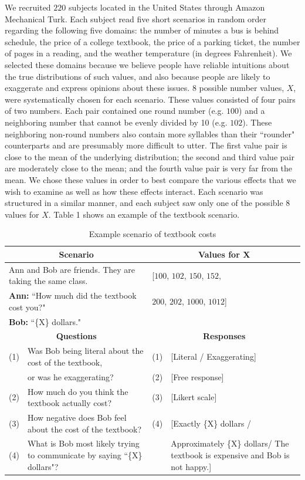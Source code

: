 \documentclass{article} %
\begin{document}
We recruited $220$ subjects located in the United States through Amazon Mechanical Turk. Each subject read five short scenarios in random order regarding the following five domains: the number of minutes a bus is behind schedule, the price of a college textbook, the price of a parking ticket, the number of pages in a reading, and the weather temperature (in degrees Fahrenheit). We selected these domains because we believe people have reliable intuitions about the true distributions of such values, and also because people are likely to exaggerate and express opinions about these issues. $8$ possible number values, $X$, were systematically chosen for each scenario. These values consisted of four pairs of two numbers. Each pair contained one round number (e.g. $100$) and a neighboring number that cannot be evenly divided by 10 (e.g. $102$). These neighboring non-round numbers also contain more syllables than their ``rounder" counterparts and are presumably more difficult to utter. The first value pair is close to the mean of the underlying distribution; the second and third value pair are moderately close to the mean; and the fourth value pair is very far from the mean. We chose these values in order to best compare the various effects that we wish to examine as well as how these effects interact. Each scenario was structured in a similar manner, and each subject saw only one of the possible $8$ values for $X$. Table 1 shows an example of the textbook scenario.
\begin{table}[h]
\begin{tabular}{| p{0.15cm}  p{8.15cm}| p{0.15cm}p{4cm} |}\hline
\multicolumn{2}{|c|}{\textbf{Scenario}} & \multicolumn{2}{|c|}{\textbf{Values for X}} \\\hline
\multicolumn{2}{|l|}{Ann and Bob are friends. They are taking the same class.} & \multicolumn{2}{|l|}{[$100$, $102$, $150$, $152$,}\\
\multicolumn{2}{|l|}{\textbf{Ann:} ``How much did the textbook cost you?"} & \multicolumn{2}{|l|}{$200$, $202$, $1000$, $1012$]}\\
\multicolumn{2}{|l|}{\textbf{Bob:} ``\{X\} dollars."} & \multicolumn{2}{|l|}{}\\\hline
\multicolumn{2}{|c|}{\textbf{Questions}} & \multicolumn{2}{|c|}{\textbf{Responses}} \\\hline
(1) & Was Bob being literal about the cost of the textbook, & (1) &[Literal / Exaggerating] \\
 & or was he exaggerating? & (2) & [Free response] \\
(2) & How much do you think the textbook actually cost? & (3) & [Likert scale] \\
(3) & How negative does Bob feel about the cost of the textbook? & (4) & [Exactly \{X\} dollars / \\
(4) & What is Bob most likely trying to communicate by saying  ``\{X\} dollars"? & & Approximately \{X\} dollars/ The textbook is expensive and Bob is not happy.]\\\hline
\end{tabular}
\caption{Example scenario of textbook costs}
\label{tab:myfirsttable}
\end{table}
\end{document}
